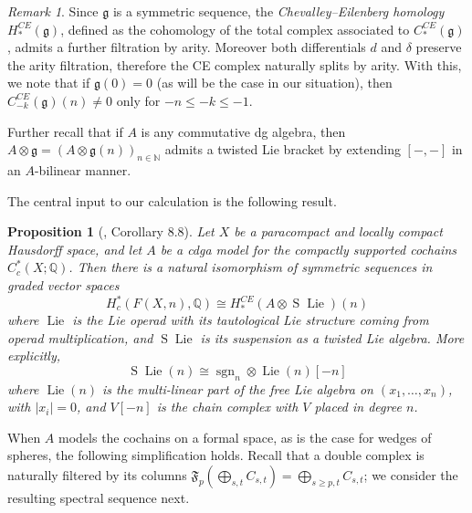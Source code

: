 \documentclass[12pt]{article}
\newcommand{\Z}{\mathbb{Z}}
\newcommand{\Q}{\mathbb{Q}}
\newcommand{\sgn}[1][n]{\operatorname{sgn}_{#1}}
\DeclareMathOperator{\Lie}{Lie}
\DeclareMathOperator{\Suspension}{S}
\theoremstyle{plain}
\newtheorem{prop}[thm]{Proposition}
\theoremstyle{definition}
\theoremstyle{remark}
\newtheorem{rmk}[thm]{Remark}
\begin{document}
\begin{rmk}\label{rmk:arity-grading-and-filtration-bound}
    Since $\mathfrak{g}$ is a symmetric sequence, the \emph{Chevalley--Eilenberg homology} $H_*^{CE}(\mathfrak{g})$, defined as the cohomology of the total complex associated to $C_*^{CE}(\mathfrak{g})$, admits a further filtration by arity. Moreover both differentials $d$ and $\delta$ preserve the arity filtration, therefore the CE complex naturally splits by arity. With this, we note that if $\mathfrak{g}(0) = 0$ (as will be the case in our situation), then $C_{-k}^{CE}(\mathfrak{g})(n) \neq 0$ only for $-n\leq -k\leq -1$.
\end{rmk}

Further recall that if $A$ is any commutative dg algebra, then $A\otimes \mathfrak{g} = ( A\otimes \mathfrak{g}(n) )_{n\in \mathbb{N}}$ admits a twisted Lie bracket by extending $[-,-]$ in an $A$-bilinear manner.

The central input to our calculation is the following result.
\begin{prop}[\cite{Pet20}, Corollary 8.8]\label{prop:CE-homology is Conf}
Let $X$ be a paracompact and locally compact Hausdorff space, and let $A$ be a cdga model for the compactly supported cochains $C_c^*(X;\Q)$. Then there is a natural isomorphism of symmetric sequences in graded vector spaces
\[ \label{isomorphism_CE}
   {H_c^{*}(F(X, n), \Q)} \cong H_{*}^{CE}(A\otimes \Suspension\Lie)(n)
\]
where $\Lie$ is the Lie operad with its tautological Lie structure coming from operad multiplication, and $\Suspension\Lie$ is its suspension as a twisted Lie algebra. More explicitly,
\[
\Suspension\Lie(n) \cong \sgn[n] \otimes \Lie(n) [ -n ]
\]
where $\Lie(n)$ is the multi-linear part of the free Lie algebra on $(x_1,\ldots,x_n)$, with $|x_i| = 0$, and $V[-n]$ is the chain complex with $V$ placed in degree $n$.
\end{prop}


When $A$ models the cochains on a formal space, as is the case for wedges of spheres, the following simplification holds. Recall that a double complex is naturally filtered by its columns $\mathfrak{F}_p \left(\bigoplus_{s,t} C_{s,t}\right) = \bigoplus_{s\geq p, t} C_{s,t}$; we consider the resulting spectral sequence next.
\end{document}
